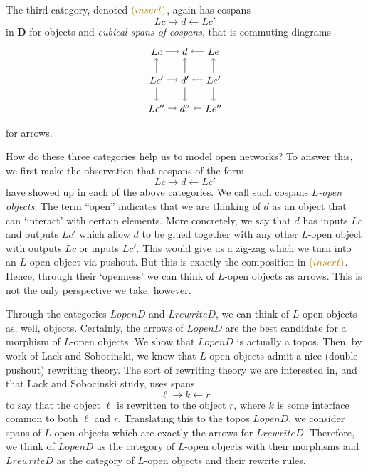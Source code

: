 \documentclass{amsart}
\newcommand{\cat}[1]{\mathbf{#1}}
\newcommand{\edit}[1]{\textcolor{editcolour}{(#1)}}
\theoremstyle{remark}
\theoremstyle{definition}
\begin{document}
The third category, denoted
$ \edit{insert} $,
again has cospans 
\[
Lc \to d \gets Lc'
\]
in $ \cat{D} $ for objects and
\emph{cubical spans of cospans}, that is
commuting diagrams 
\[ %
\begin{tikzpicture}
\node (Lc) at (-1,1) {$ Lc $};
\node (Lc') at (-1,0) {$ Lc' $};
\node (Lc'') at (-1,-1) {$ Lc'' $};
\node (d) at (0,1) {$ d $};
\node (d') at (0,0) {$ d' $};
\node (d'') at (0,-1) {$ d'' $};
\node (Le) at (1,1) {$ Le $};
\node (Le') at (1,0) {$ Le' $};
\node (Le'') at (1,-1) {$ Le'' $};
\draw [->] (Lc) to (d);
\draw [->] (Le) to (d);
\draw [->] (Lc') to (d');
\draw [->] (Le') to (d');
\draw [->] (Lc'') to (d'');
\draw [->] (Le'') to (d'');
\draw [->] (Lc') to (Lc);
\draw [->] (Lc') to (Lc'');
\draw [->] (d') to (d);
\draw [->] (d') to (d'');
\draw [->] (Le') to (Le);
\draw [->] (Le') to (Le'');
\end{tikzpicture}
\]
for arrows.  

How do these three categories help
us to model open networks?
To answer this, we first make the
observation that cospans of the form
\[
Lc \to d \gets Lc'
\]
have showed up in each of the above
categories. We call such cospans
\emph{$L$-open objects}.  The term ``open''
indicates that we are thinking of $d$ as 
an object that can `interact' with certain 
elements. More concretely, we say that $ d $ 
has inputs $Lc$ and outputs $ Lc' $ which allow
$ d $ to be glued together with any other
$ L $-open object with outputs $ Lc $ or 
inputs $ Lc' $.  This would give us a zig-zag
which we turn into an $ L $-open object
via pushout.  But this is exactly the composition
in $ \edit{insert} $. Hence, through their `openness' 
we can think of $ L $-open objects as arrows.
This is not the only perspective we take, however.

Through the categories $ LopenD $ and $ LrewriteD $,
we can think of $ L $-open objects as, well, objects.
Certainly, the arrows of $ LopenD $ are the best
candidate for a morphism of $ L $-open objects.  
We show that $ LopenD $ is actually a topos.
Then, by work of Lack and Sobocinski, we know that
$ L $-open objects admit a nice (double pushout)
rewriting theory. The sort of rewriting theory we are
interested in, and that Lack and Sobocinski study,
uses spans 
\[
\ell \to k \gets r
\]
to say that the object $ \ell $ is
rewritten to the object $ r $, where $ k $
is some interface common to both 
$ \ell $ and $ r $.  Translating this to the topos 
$ LopenD $, we consider spans of $ L $-open objects
which are exactly the arrows for $ LrewriteD $.
Therefore, we think of $ LopenD $ as the
category of $ L $-open objects with their
morphisms and $ LrewriteD $ as the category
of $ L $-open objects and their rewrite rules.  
\end{document}
